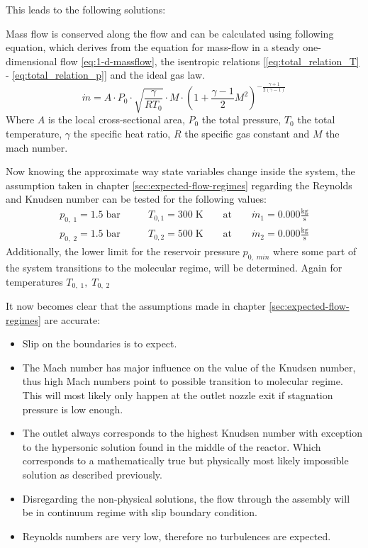 	This leads to the following solutions:
	
	Mass flow is conserved along the flow and can be calculated using following equation, which derives from the equation for mass-flow in a steady one-dimensional flow \eqref{eq:1-d-massflow}, the isentropic relations [\eqref{eq:total_relation_T} - \eqref{eq:total_relation_p}] and the ideal gas law.
	\cite{benson_mass_nodate}
	\begin{equation}
		\dot{m} = A \cdot P_0 \cdot \sqrt{\frac{\gamma}{R T_0}} \cdot M \cdot \left(1 + \frac{\gamma - 1}{2} M^2\right)^{-\frac{\gamma + 1}{2(\gamma - 1)}}
	\end{equation}\label{eq:1-d-massflow}
	Where $A$ is the local cross-sectional area, $P_0$ the total pressure, $T_0$ the total temperature, $\gamma$ the specific heat ratio, $R$ the specific gas constant and $M$ the mach number.
	\cite{Cantwell_AA210A}

	Now knowing the approximate way state variables change inside the system, the assumption taken in chapter \ref{sec:expected-flow-regimes} regarding the Reynolds and Knudsen number can be tested for the following values:
	\begin{align*}
		p_{0,\;1} = 1.5\;\text{bar}
			&\qquad T_{0,1} = 300\;\text{K}
			\qquad \text{at} \qquad \dot{m}_1 = 0.000 \frac{\text{kg}}{\text{s}}\\
		p_{0,\;2} = 1.5\;\text{bar}
			&\qquad T_{0,2} = 500\;\text{K}
			\qquad \text{at} \qquad \dot{m}_2 = 0.000 \frac{\text{kg}}{\text{s}}
	\end{align*}
	Additionally, the lower limit for the reservoir pressure $p_{0,\;min}$ where some part of the system transitions to the molecular regime, will be determined.
	Again for temperatures $T_{0,\;1},\;T_{0,\;2}$
	
	\noindent It now becomes clear that the assumptions made in chapter \ref{sec:expected-flow-regimes} are accurate:
	\begin{itemize}
		\item Slip on the boundaries is to expect.
		\item The Mach number has major influence on the value of the Knudsen number, thus high Mach numbers point to possible transition to molecular regime. This will most likely only happen at the outlet nozzle exit if stagnation pressure is low enough.
		\item The outlet always corresponds to the highest Knudsen number with exception to the hypersonic solution found in the middle of the reactor. Which corresponds to a mathematically true but physically most likely impossible solution as described previously.
		\item Disregarding the non-physical solutions, the flow through the assembly will be in continuum regime with slip boundary condition.
		\item Reynolds numbers are very low, therefore no turbulences are expected.
	\end{itemize}
